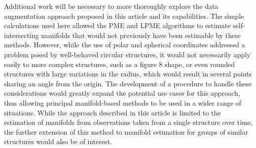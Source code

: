 \documentclass[11pt,reqno]{article}
\theoremstyle{definition}
\begin{document}
Additional work will be necessary to more thoroughly explore the data augmentation approach proposed in this article and its capabilities. The simple calculations used here allowed the PME and LPME algorithms to estimate self-intersecting manifolds that would not previously have been estimable by these methods. However, while the use of polar and spherical coordinates addressed a problem posed by well-behaved circular structures, it would not necessarily apply easily to more complex structures, such as a figure 8 shape, or even rounded structures with large variations in the radius, which would result in several points sharing an angle from the origin. The development of a procedure to handle these considerations would greatly expand the potential use cases for this approach, thus allowing principal manifold-based methods to be used in a wider range of situations. While the approach described in this article is limited to the estimation of manifolds from observations taken from a single structure over time, the further extension of this method to manifold estimation for groups of similar structures would also be of interest.

\newpage

\nocite{*}
%
%
\printbibliography
\end{document}
